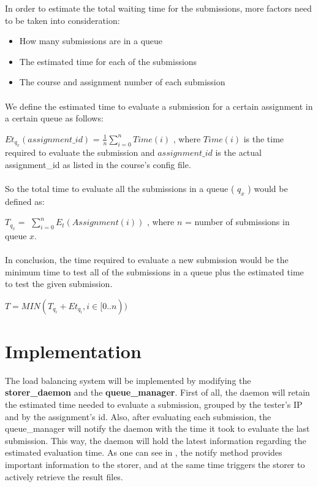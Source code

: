 In order to estimate the total waiting time for the submissions, more factors
need to be taken into consideration:
\begin{itemize}
\item How many submissions are in a queue
\item The estimated time for each of the submissions
\item The course and assignment number of each submission 
\end{itemize}

\paragraph{}

We define the estimated time to evaluate a submission for a certain assignment in 
a certain queue as follows:

$ Et_{q_x}( assignment\_id) $ = $\frac{1}{n} \displaystyle\sum\limits_{i=0}^{n} Time(i)$ , where
$ Time(i) $ is the time required to evaluate the submission and $assignment\_id$ is the actual 
assignment_id as listed in the course's config file.

\paragraph{}

So the total time to evaluate all the submissions in a queue ( $ q_x $ ) would be defined as:

$ T_{ q_x} = $ $\displaystyle\sum\limits_{i=0}^{n} E_t(Assignment(i))$ , where $ n $ = number of submissions in  queue $  x $.

\paragraph{}

In conclusion, the time required to evaluate a new submission would be the minimum time
to test all of the submissions in a queue plus the estimated time to test the given
submission.

$ T = MIN( T_{q_i} + Et_{q_i}, i \in [0..n) ) $


\section{Implementation}
\label{sec:vmc-load-impl}

The load balancing system will be implemented by modifying the {\bf storer_daemon}
and the {\bf queue_manager}. First of all, the daemon will retain the estimated
time needed to evaluate a submission, grouped by the tester's IP and by
the assignment's id. Also, after evaluating each submission, the queue_manager
will notify the daemon with the time it took to evaluate the last submission.
This way, the daemon will hold the latest information regarding the estimated
evaluation time. As one can see in ,
the notify method provides important information to the storer, and at the same
time triggers the storer to actively retrieve the result files.

